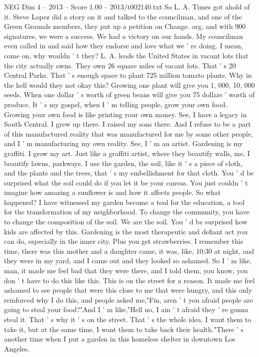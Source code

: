 \begin{textsample}{NEG Dim 4 – 2013 – Score 1.00 – 2013/t002140.txt}
So L.
A.
Times got ahold of it.
Steve Lopez did a story on it and talked to the councilman, and one of the Green Grounds members, they put up a petition on Change. org, and with 900 signatures, we were a success.
We had a victory on our hands.
My councilman even called in and said how they endorse and love what we ' re doing.
I mean, come on, why wouldn ' t they?
L.
A. leads the United States in vacant lots that the city actually owns.
They own 26 square miles of vacant lots.
That ' s 20 Central Parks.
That ' s enough space to plant 725 million tomato plants.
Why in the hell would they not okay this?
Growing one plant will give you 1, 000, 10, 000 seeds.
When one dollar ' s worth of green beans will give you 75 dollars ' worth of produce.
It ' s my gospel, when I ' m telling people, grow your own food.
Growing your own food is like printing your own money.
See, I have a legacy in South Central.
I grew up there.
I raised my sons there.
And I refuse to be a part of this manufactured reality that was manufactured for me by some other people, and I ' m manufacturing my own reality.
See, I ' m an artist.
Gardening is my graffiti.
I grow my art.
Just like a graffiti artist, where they beautify walls, me, I beautify lawns, parkways.
I use the garden, the soil, like it ' s a piece of cloth, and the plants and the trees, that ' s my embellishment for that cloth.
You ' d be surprised what the soil could do if you let it be your canvas.
You just couldn ' t imagine how amazing a sunflower is and how it affects people.
So what happened?
I have witnessed my garden become a tool for the education, a tool for the transformation of my neighborhood.
To change the community, you have to change the composition of the soil.
We are the soil.
You ' d be surprised how kids are affected by this.
Gardening is the most therapeutic and defiant act you can do, especially in the inner city.
Plus you get strawberries.
I remember this time, there was this mother and a daughter came, it was, like, 10:30 at night, and they were in my yard, and I came out and they looked so ashamed.
So I ' m like, man, it made me feel bad that they were there, and I told them, you know, you don ' t have to do this like this.
This is on the street for a reason.
It made me feel ashamed to see people that were this close to me that were hungry, and this only reinforced why I do this, and people asked me,"Fin, aren ' t you afraid people are going to steal your food?"And I ' m like,"Hell no, I ain ' t afraid they ' re gonna steal it.
That ' s why it ' s on the street.
That ' s the whole idea.
I want them to take it, but at the same time, I want them to take back their health."There ' s another time when I put a garden in this homeless shelter in downtown Los Angeles.

\end{textsample}
